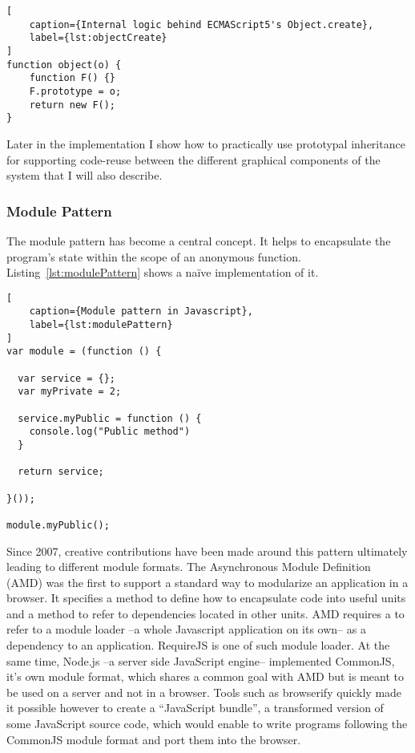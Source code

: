 \begin{lstlisting}[
    caption={Internal logic behind ECMAScript5's Object.create},
    label={lst:objectCreate}
]
function object(o) {
    function F() {}
    F.prototype = o;
    return new F();
}
\end{lstlisting}

Later in the implementation I show how to practically use prototypal inheritance for supporting code-reuse between the different graphical components of the system that I will also describe.

\subsubsection{Module Pattern}

The module pattern\cite{Miraglia2007} has become a central concept. It helps to encapsulate the program's state within the scope of an anonymous function. Listing~\ref{lst:modulePattern} shows a naïve implementation of it.

\begin{lstlisting}[
    caption={Module pattern in Javascript},
    label={lst:modulePattern}
]
var module = (function () {

  var service = {};
  var myPrivate = 2;
  
  service.myPublic = function () {
    console.log("Public method")
  } 

  return service;

}());

module.myPublic();
\end{lstlisting}

Since 2007, creative contributions have been made around this pattern ultimately leading to different module formats. The Asynchronous Module Definition (AMD) was the first to support a standard way to modularize an application in a browser. It specifies a method to define how to encapsulate code into useful units and a method to refer to dependencies located in other units. AMD requires a to refer to a module loader --a whole Javascript application on its own-- as a dependency to an application. RequireJS is one of such module loader. At the same time, Node.js --a server side JavaScript engine-- implemented CommonJS, it's own module format, which shares a common goal with AMD but is meant to be used on a server and not in a browser. Tools such as browserify quickly made it possible however to create a ``JavaScript bundle'', a transformed version of some JavaScript source code, which would enable to write programs following the CommonJS module format and port them into the browser. 

